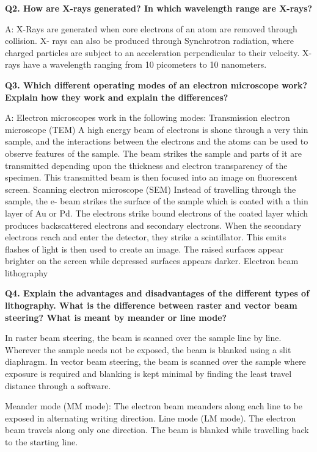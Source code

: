 \documentclass[12pt]{article}
\begin{document}
\textbf{Q2. How are X-rays generated? In which wavelength range are X-rays?}

A: X-Rays are generated when core electrons of an atom are removed through collision. X- rays
can also be produced through Synchrotron radiation, where charged particles are subject to an
acceleration perpendicular to their velocity.
X-rays have a wavelength ranging from 10 picometers to 10 nanometers.

\textbf{Q3. Which different operating modes of an electron microscope work? Explain how they
work and explain the differences?}

A: Electron microscopes work in the following modes:
Transmission electron microscope (TEM)
A high energy beam of electrons is shone through a very thin sample, and the interactions
between the electrons and the atoms can be used to observe features of the sample. The beam
strikes the sample and parts of it are transmitted depending upon the thickness and electron
transparency of the specimen. This transmitted beam is then focused into an image on
fluorescent screen.
Scanning electron microscope (SEM)
Instead of travelling through the sample, the e- beam strikes the surface of the sample which is
coated with a thin layer of Au or Pd. The electrons strike bound electrons of the coated layer
which produces backscattered electrons and secondary electrons. When the secondary
electrons reach and enter the detector, they strike a scintillator. This emits flashes of light is
then used to create an image. The raised surfaces appear brighter on the screen while depressed
surfaces appears darker.
Electron beam lithography

\textbf{Q4. Explain the advantages and disadvantages of the different types of lithography. What is
the difference between raster and vector beam steering? What is meant by meander or
line mode?}

In raster beam steering, the beam is scanned over the sample line by line. Wherever the sample
needs not be exposed, the beam is blanked using a slit diaphragm.
In vector beam steering, the beam is scanned over the sample where exposure is required and
blanking is kept minimal by finding the least travel distance through a software.

Meander mode (MM mode): The electron beam meanders along each line to be exposed in
alternating writing direction.
Line mode (LM mode). The electron beam travels along only one direction. The beam is
blanked while travelling back to the starting line.
\end{document}

